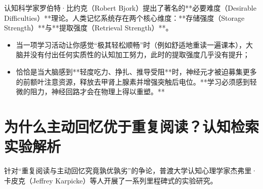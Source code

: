 \documentclass[12pt,a4paper,openany]{ctexbook}
\begin{document}
认知科学家罗伯特·比约克（Robert Bjork）提出了著名的**必要难度（Desirable Difficulties）**理论。人类记忆系统存在两个核心维度：**存储强度（Storage Strength）**与**提取强度（Retrieval Strength）**。
\begin{itemize}
    \item 当一项学习活动让你感觉“极其轻松顺畅”时（例如舒适地重读一遍课本），大脑并没有付出任何实质性的认知加工努力，此时的提取强度几乎没有提升；
    \item 恰恰是当大脑感到**轻度吃力、挣扎、推导受阻**时，神经元才被迫募集更多的前额叶注意资源，释放去甲肾上腺素并增强突触后电位。**学习必须感到轻微的阻力，神经回路才会在物理上得以重塑。**
\end{itemize}

\section{为什么主动回忆优于重复阅读？认知检索实验解析}

针对“重复阅读与主动回忆究竟孰优孰劣”的争论，普渡大学认知心理学家杰弗里·卡皮克（Jeffrey Karpicke）等人开展了一系列里程碑式的实验研究。
\end{document}
